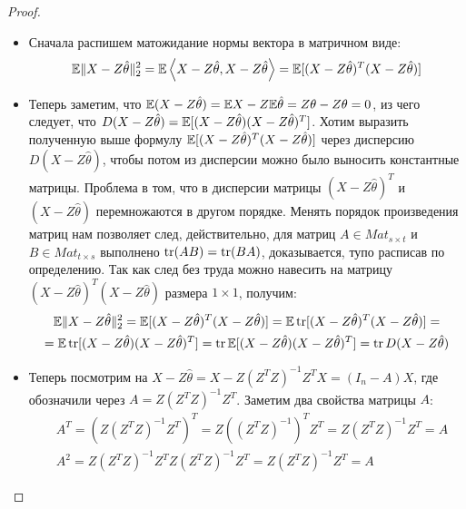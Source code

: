 \begin{proof}~
    \begin{itemize}
        \item Сначала распишем матожидание нормы вектора в матричном виде:
        \[
            \mathbb{E} \|X - Z\hat{\theta}\|_2^2 = \mathbb{E} \left\langle X - Z\hat{\theta}, X - Z\hat{\theta}\right\rangle = \mathbb{E} [(X - Z\hat{\theta})^T (X - Z\hat{\theta})]
        \]

        \item Теперь заметим, что $\mathbb{E} (X - Z \hat{\theta}) = \mathbb{E} X - Z \mathbb{E} \hat{\theta} = Z\theta - Z\theta = 0$, из чего следует, что $D (X - Z \hat{\theta}) = \mathbb{E} [(X - Z \hat{\theta}) (X - Z \hat{\theta})^T]$. Хотим выразить полученную выше формулу $\mathbb{E} [(X - Z\hat{\theta})^T (X - Z\hat{\theta})]$ через дисперсию $D (X - Z \hat{\theta})$, чтобы потом из дисперсии можно было выносить константные матрицы. Проблема в том, что в дисперсии матрицы $(X - Z \hat{\theta})^T$ и $(X - Z \hat{\theta})$ перемножаются в другом порядке. Менять порядок произведения матриц нам позволяет след, действительно, для матриц $A \in Mat_{s \times t}$ и $B \in Mat_{t \times s}$ выполнено $\operatorname{tr}(AB) = \operatorname{tr}(BA)$, доказывается, тупо расписав по определению. Так как след без труда можно навесить на матрицу $(X - Z\hat{\theta})^T (X - Z\hat{\theta})$ размера $1 \times 1$, получим:
        \begin{multline*}
            \mathbb{E} \|X - Z\hat{\theta}\|_2^2 = \mathbb{E} [(X - Z\hat{\theta})^T (X - Z\hat{\theta})] = \mathbb{E} \operatorname{tr} [(X - Z\hat{\theta})^T (X - Z\hat{\theta})] =
            \\
            = \mathbb{E} \operatorname{tr} [(X - Z\hat{\theta}) (X - Z\hat{\theta})^T] = \operatorname{tr} \mathbb{E} [(X - Z\hat{\theta}) (X - Z\hat{\theta})^T] = \operatorname{tr} D (X - Z\hat{\theta})
        \end{multline*}
        
        \item Теперь посмотрим на $X - Z\hat{\theta} = X - Z (Z^T Z)^{-1} Z^T X = (I_n - A) X$, где обозначили через $A = Z (Z^T Z)^{-1} Z^T$. Заметим два свойства матрицы $A$:
        \begin{align*}
            & A^T = (Z (Z^T Z)^{-1} Z^T)^T = Z ((Z^T Z)^{-1})^T Z^T = Z (Z^T Z)^{-1} Z^T = A
            \\
            & A^2 = Z (Z^T Z)^{-1} Z^T Z (Z^T Z)^{-1} Z^T = Z (Z^T Z)^{-1} Z^T = A
        \end{align*}


\end{itemize}
\end{proof}
